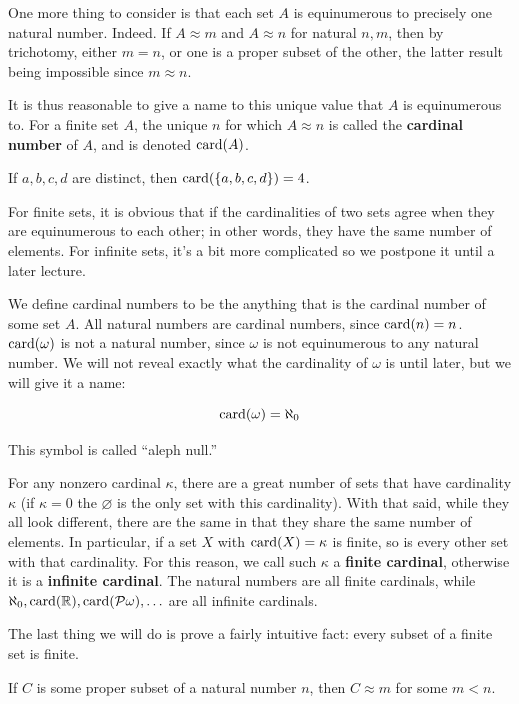 One more thing to consider is that each set $A$ is equinumerous to precisely one natural number. Indeed. If $A \approx m$ and $A \approx n$ for natural $n,m$, then by trichotomy, either $m = n$, or one is a proper subset of the other, the latter result being impossible since $m \approx n$. 

It is thus reasonable to give a name to this unique value that $A$ is equinumerous to. For a finite set $A$, the unique $n$ for which $A \approx n$ is called the \textbf{cardinal number} of $A$, and is denoted $\operatorname{card}(A)$. 

\begin{example}
    If $a,b,c,d$ are distinct, then $\operatorname{card}(\{a,b,c,d\}) = 4$.
\end{example}

For finite sets, it is obvious that if the cardinalities of two sets agree when they are equinumerous to each other; in other words, they have the same number of elements. For infinite sets, it's a bit more complicated so we postpone it until a later lecture. 

We define cardinal numbers to be the anything that is the cardinal number of some set $A$. All natural numbers are cardinal numbers, since $\operatorname{card}(n) = n$. $\operatorname{card}(\omega)$ is not a natural number, since $\omega$ is not equinumerous to any natural number. We will not reveal exactly what the cardinality of $\omega$ is until later, but we will give it a name:

\[\operatorname{card}(\omega) = \aleph_0\]

This symbol is called ``aleph null.'' 

For any nonzero cardinal $\kappa$, there are a great number of sets that have cardinality $\kappa$ (if $\kappa = 0$ the $\varnothing$ is the only set with this cardinality). With that said, while they all look different, there are the same in that they share the same number of elements. In particular, if a set $X$ with $\operatorname{card}(X) = \kappa$ is finite, so is every other set with that cardinality. For this reason, we call such $\kappa$ a \textbf{finite cardinal}, otherwise it is a \textbf{infinite cardinal}. The natural numbers are all finite cardinals, while $\aleph_0, \operatorname{card}(\mathbb{R}), \operatorname{card}(\mathcal{P}\omega), \ldots$ are all infinite cardinals.

The last thing we will do is prove a fairly intuitive fact: every subset of a finite set is finite.

\begin{lemma}
    If $C$ is some proper subset of a natural number $n$, then $C \approx m$ for some $m < n$. 
\end{lemma}

